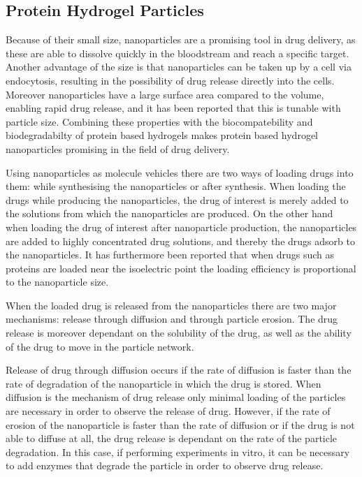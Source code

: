 \subsection{Protein Hydrogel Particles}
Because of their small size, nanoparticles are a promising tool in drug delivery, as these are able to dissolve  quickly in the bloodstream and reach a specific target. Another advantage of the size is that nanoparticles can be taken up by a cell via endocytosis, resulting in the possibility of drug release directly into the cells. Moreover nanoparticles have a large surface area compared to the volume, enabling rapid drug release, and it has been reported that this is tunable with particle size. Combining these properties with the biocompatebility and biodegradabilty of protein based hydrogels makes protein based hydrogel nanoparticles promising in the field of drug delivery. \parencite{Jacob2018biopolymerBasedNano, Hong2020ProteinBasedNanoparticles}
\par
%
Using nanoparticles as molecule vehicles there are two ways of loading drugs into them: while synthesising the nanoparticles or after synthesis. When loading the drugs while producing the nanoparticles, the drug of interest is merely added to the solutions from which the nanoparticles are produced. On the other hand when loading the drug of interest after nanoparticle production, the nanoparticles are added to highly concentrated drug solutions, and thereby the drugs adsorb to the nanoparticles. It has furthermore been reported that when drugs such as proteins are loaded near the isoelectric point the loading efficiency is proportional to the nanoparticle size. \parencite{Hong2020ProteinBasedNanoparticles}
\par
%
When the loaded drug is released from the nanoparticles there are two major mechanisms: release through diffusion and through particle erosion. The drug release is moreover dependant on the solubility of the drug, as well as the ability of the drug to move in the particle network. \parencite{Hong2020ProteinBasedNanoparticles, Couvreur1993NanoMicropartDelivery}
\par
%
Release of drug through diffusion occurs if the rate of diffusion is faster than the rate of degradation of the nanoparticle in which the drug is stored. When diffusion is the mechanism of drug release only minimal loading of the particles are necessary in order to observe the release of drug. However, if the rate of erosion of the nanoparticle is faster than the rate of diffusion or if the drug is not able to diffuse at all, the drug release is dependant on the rate of the particle degradation. In this case, if performing experiments in vitro, it can be necessary to add enzymes that degrade the particle in order to observe drug release. \parencite{Hong2020ProteinBasedNanoparticles, Couvreur1993NanoMicropartDelivery}



